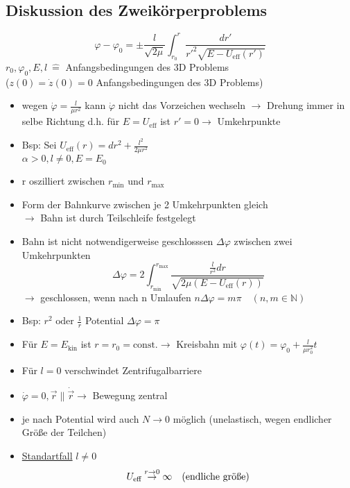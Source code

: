 \documentclass[titlepage,12pt,a4paper,ngerman]{report}
\newcommand{\tx}[1]{\textrm{#1}}
\begin{document}
\subsection{Diskussion des Zweikörperproblems}
$$\varphi - \varphi_0 = \pm \frac{l}{\sqrt{2 \mu}} \int_{r_0}^{r} \frac{dr'}{r'^2 \sqrt{E - U_{\tx{eff}} (r')}}$$
$ r_0, \varphi_0, E, l \  \widehat{=} $ Anfangsbedingungen des 3D Problems\\
($ z(0) = \dot{z}(0)  = 0 $ Anfangsbedingungen des 3D Problems)
\begin{itemize}
	\item wegen $ \dot{\varphi} = \frac{l}{\mu r^2} $ kann $ \dot{\varphi} $ nicht das Vorzeichen wechseln $ \rightarrow $ Drehung immer in selbe Richtung d.h. für $  E = U_{\tx{eff}} $ ist $ r' = 0  \rightarrow $ Umkehrpunkte
	\item Bsp: Sei $ U_{\tx{eff}} (r) = dr^2 + \frac{l^2}{2 \mu r^2}$ \\
	$\alpha > 0 , l \neq 0, E = E_0$
	\item  r oszilliert zwischen $ r_{\tx{min}} $ und $ r_{\tx{max}} $ 
	\item Form der Bahnkurve zwischen je 2 Umkehrpunkten gleich\\
	$ \rightarrow $ Bahn ist durch Teilschleife festgelegt
	\item  Bahn ist nicht notwendigerweise geschlosssen $ \Delta \varphi $ zwischen zwei Umkehrpunkten 
	$$\Delta \varphi = 2 \int_{r_{\tx{min}}}^{r_{\tx{max}}} \frac{\frac{l}{r^2} dr}{\sqrt{ 2\mu (E-U_{\tx{eff}}(r))}}$$
	$ \rightarrow $ geschlossen, wenn nach n Umlaufen $ n \Delta \varphi = m \pi \quad (n,m \in \mathbb{N}) $
	\item Bsp: $ r^2  \tx{ oder } \frac{1}{r}$ Potential $ \Delta \varphi = \pi $\\
	\item  Für $ E = E_{\tx{kin}} $ ist $ r = r_0 = \tx{const.} \rightarrow$ Kreisbahn mit $ \varphi(t)  = \varphi_0 + \frac{l}{\mu r^2_0} t $ 
	\item Für $ l = 0 $ verschwindet Zentrifugalbarriere
	\item $ \dot{\varphi} = 0 , \vec{r} \parallel \dot{\vec{r}} \rightarrow $ Bewegung zentral
	\item  je nach Potential wird auch $ N \rightarrow 0 $ möglich (unelastisch, wegen endlicher Größe der Teilchen)
	\item \underline{Standartfall} $ l \neq 0 $\\
	$$\begin{array}{ll}
	U_{\tx{eff}} \buildrel r \rightarrow 0 \over \rightarrow \infty & \tx{(endliche größe)} \\

\end{array}$$
\end{itemize}
\end{document}
